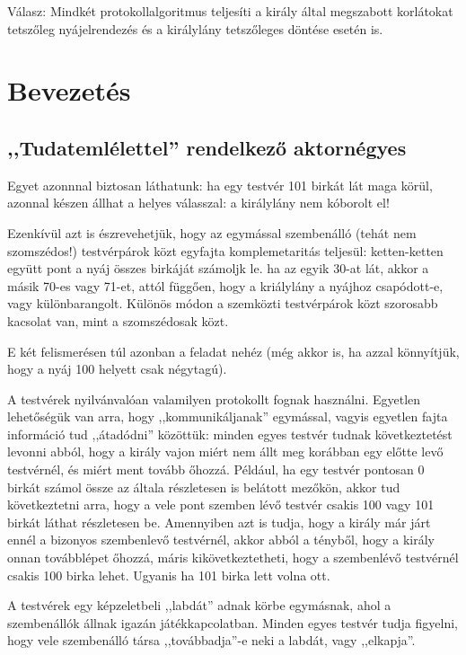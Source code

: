 \documentclass{article}
\begin{document}
	Válasz: Mindkét protokollalgoritmus teljesíti a király által megszabott korlátokat tetszőleg nyájelrendezés és a királylány tetszőleges döntése esetén is.

	\section{Bevezetés}

	\subsection{,,Tudatemlélettel'' rendelkező aktornégyes}

	Egyet azonnnal biztosan láthatunk: ha egy testvér 101 birkát lát maga körül, azonnal készen állhat a helyes válasszal: a királylány nem kóborolt el!

	Ezenkívül azt is észrevehetjük, hogy az egymással szembenálló (tehát nem szomszédos!) testvérpárok közt egyfajta komplemetaritás teljesül: ketten-ketten együtt pont a nyáj összes birkáját számoljk le. ha az egyik 30-at lát, akkor a másik 70-es vagy 71-et, attól függően, hogy a kriálylány a nyájhoz csapódott-e, vagy különbarangolt. Különös módon a szemközti testvérpárok közt szorosabb kacsolat van, mint a szomszédosak közt.

	E két felismerésen túl azonban a feladat nehéz (még akkor is, ha azzal könnyítjük, hogy a nyáj 100 helyett csak négytagú).
 
	A testvérek nyilvánvalóan valamilyen protokollt fognak használni. Egyetlen lehetőségük van arra, hogy ,,kommunikáljanak'' egymással, vagyis egyetlen fajta információ tud ,,átadódni'' közöttük: minden egyes testvér tudnak következtetést levonni abból, hogy a király vajon miért nem állt meg korábban egy előtte levő testvérnél, és miért ment tovább őhozzá. Például, ha egy testvér pontosan 0 birkát számol össze az általa részletesen is belátott mezőkön, akkor tud következtetni arra, hogy a vele pont szemben lévő testvér csakis 100 vagy 101 birkát láthat részletesen be. Amennyiben azt is tudja, hogy a király már járt ennél a bizonyos szembenlevő testvérnél, akkor abból a tényből, hogy a király onnan továbblépet őhozzá, máris kikövetkeztetheti, hogy a szembenlévő testvérnél csakis 100 birka lehet. Ugyanis ha 101 birka lett volna ott.

	A testvérek egy képzeletbeli ,,labdát'' adnak körbe egymásnak, ahol a szembenállók állnak igazán játékkapcolatban. Minden egyes testvér tudja figyelni, hogy vele szembenálló társa ,,továbbadja''-e neki a labdát, vagy ,,elkapja''.
\end{document}
